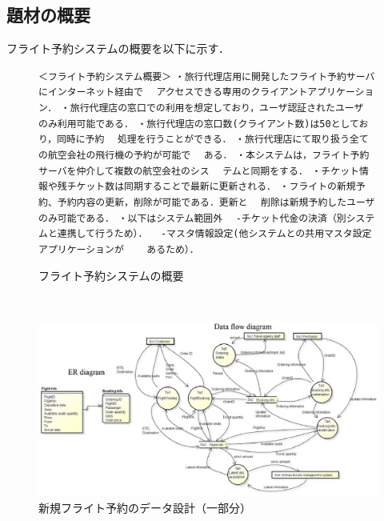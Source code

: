 \subsection{題材の概要}
フライト予約システムの概要を以下に示す．
\begin{figure}[h]%
\vbox{%
{\scriptsize
\hbox{\verb/＜フライト予約システム概要＞/}
\hbox{\verb/・旅行代理店用に開発したフライト予約サーバにインターネット経由で/}
\hbox{\verb/　アクセスできる専用のクライアントアプリケーション．/}
\hbox{\verb/・旅行代理店の窓口での利用を想定しており，ユーザ認証されたユーザ/}
\hbox{\verb/　のみ利用可能である．/}
\hbox{\verb/・旅行代理店の窓口数(クライアント数)は50としており，同時に予約/}
\hbox{\verb/　処理を行うことができる．/}
\hbox{\verb/・旅行代理店にて取り扱う全ての航空会社の飛行機の予約が可能で/}
\hbox{\verb/　ある．/}
\hbox{\verb/・本システムは，フライト予約サーバを仲介して複数の航空会社のシス/}
\hbox{\verb/　テムと同期をする．/}
\hbox{\verb/・チケット情報や残チケット数は同期することで最新に更新される．/}
\hbox{\verb/・フライトの新規予約、予約内容の更新，削除が可能である．更新と/}
\hbox{\verb/　削除は新規予約したユーザのみ可能である．/}
\hbox{\verb/・以下はシステム範囲外/}
\hbox{\verb/　-チケット代金の決済（別システムと連携して行うため）．/}
\hbox{\verb/　-マスタ情報設定(他システムとの共用マスタ設定アプリケーションが/}
\hbox{\verb/　　あるため）．/}
}
}
\begin{center}
\end{center}
\caption{フライト予約システムの概要}
\label{OVSPEC}
\end{figure}

\begin{figure}[tb]　%
\begin{center}
\includegraphics[scale=0.68]{./image/dfdanderd.eps}
\end{center}
\caption{新規フライト予約のデータ設計（一部分）}
\label{fig:DFD}
\end{figure}

